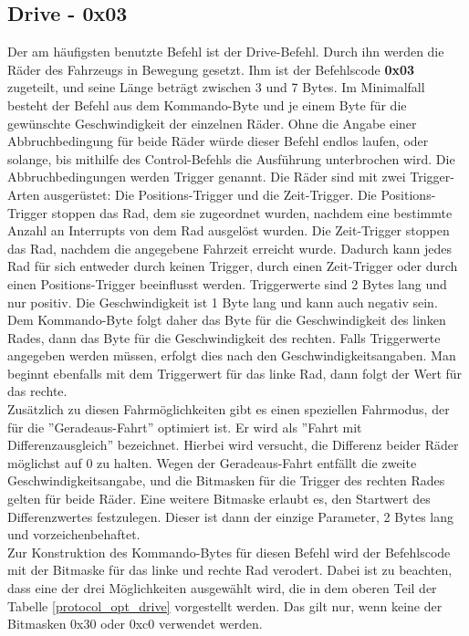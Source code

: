 \subsection{Drive - 0x03}
Der am häufigsten benutzte Befehl ist der Drive-Befehl. Durch ihn werden die Räder des Fahrzeugs
in Bewegung gesetzt. Ihm ist der Befehlscode \textbf{0x03} zugeteilt, und seine Länge beträgt zwischen 3
und 7 Bytes. Im Minimalfall besteht der Befehl aus dem Kommando-Byte und je einem Byte für
die gewünschte Geschwindigkeit der einzelnen Räder. Ohne die Angabe einer Abbruchbedingung für
beide Räder würde dieser Befehl endlos laufen, oder solange, bis mithilfe des Control-Befehls
die Ausführung unterbrochen wird. Die Abbruchbedingungen werden Trigger genannt. 
Die Räder sind mit zwei Trigger-Arten ausgerüstet:
Die Positions-Trigger und die Zeit-Trigger. Die Positions-Trigger stoppen
das Rad, dem sie zugeordnet wurden, nachdem eine bestimmte Anzahl an Interrupts von dem Rad
ausgelöst wurden. Die Zeit-Trigger stoppen das Rad, nachdem die angegebene Fahrzeit erreicht
wurde. 
Dadurch kann jedes Rad für sich entweder durch keinen Trigger, durch einen Zeit-Trigger
oder durch einen Positions-Trigger beeinflusst werden.
Triggerwerte sind
2 Bytes lang und nur positiv. Die Geschwindigkeit ist 1 Byte lang und kann auch negativ sein.
Dem Kommando-Byte folgt daher das Byte für die Geschwindigkeit des linken Rades, dann
das Byte für die Geschwindigkeit des rechten. Falls Triggerwerte angegeben werden müssen,
erfolgt dies nach den Geschwindigkeitsangaben.
Man beginnt ebenfalls mit dem Triggerwert für das linke Rad, dann folgt der
Wert für das rechte.\\
Zusätzlich zu diesen Fahrmöglichkeiten gibt es einen speziellen Fahrmodus, der für
die ''Geradeaus-Fahrt'' optimiert ist. Er wird als ''Fahrt mit Differenzausgleich''
bezeichnet. Hierbei wird versucht, die Differenz beider Räder möglichst auf 0 zu
halten. Wegen der Geradeaus-Fahrt entfällt die zweite Geschwindigkeitsangabe, und 
die Bitmasken für die Trigger des rechten Rades gelten für beide Räder. Eine weitere
Bitmaske erlaubt es, den Startwert des Differenzwertes festzulegen. Dieser ist dann
der einzige Parameter, 2 Bytes lang und vorzeichenbehaftet.\\
Zur Konstruktion des Kommando-Bytes für diesen Befehl wird der Befehlscode mit der Bitmaske
für das linke und rechte Rad verodert.
Dabei ist zu beachten, dass eine der drei Möglichkeiten
ausgewählt wird, die in dem oberen Teil der Tabelle \ref{protocol_opt_drive} vorgestellt werden.
Das gilt nur, wenn keine der Bitmasken 0x30 oder 0xc0 verwendet werden.
